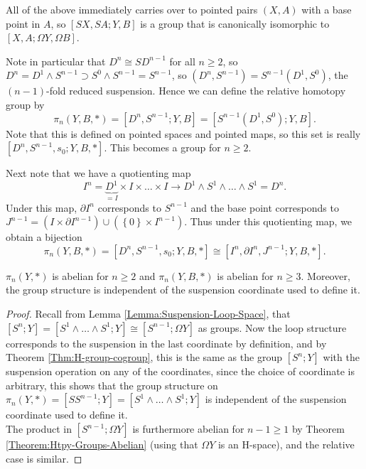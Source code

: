   All of the above immediately carries over to pointed
  pairs $(X,A)$ with a base point in $A$, so
  $\left[ SX, SA ; Y,B \right] $ is a group that
  is canonically isomorphic to
  $\left[ X,A; \Omega Y, \Omega B \right] $.

  Note in particular that
  $D^{n} \cong S D^{n-1}$ for all $n\ge 2$, so
  $D^{n} = D^{1} \wedge S^{n-1} \supset 
  S^{0} \wedge S^{n-1} = S^{n-1}$, so
  $\left( D^{n}, S^{n-1} \right) 
  = S^{n-1} \left( D^{1}, S^{0} \right) $, the
  $(n-1)$-fold reduced suspension. Hence
  we can define the relative homotopy group by
  \[
  \pi_n \left( Y,B,* \right) =
  \left[ D^{n}, S^{n-1}; Y ,B \right] 
  = \left[ S^{n-1}\left( D^{1}, S^{0} \right) ;
  Y,B\right] .
  \] 
  Note that this is defined on pointed spaces and pointed maps,
  so this set is really
  $\left[ D^{n},S^{n-1},s_0; Y,B, * \right] $.
  This becomes a group for $n\ge 2$. 

  Next note that we have a quotienting map
  \[
      I^{n} = \underbrace{D^{1}}_{=I} \times I \times \ldots \times I
      \to D^{1} \wedge S^{1} \wedge \ldots
      \wedge S^{1} =
      D^{n}.
  \] 
  Under this map, 
  $\partial I^{n}$ corresponds to
  $S^{n-1}$ and
  the base point corresponds to
  $J^{n-1} = \left( I \times \partial I^{n-1} \right) 
  \cup  \left( \left\{ 0 \right\} \times I^{n-1} \right) $.
  Thus under this quotienting map, we obtain a
  bijection
  \[
  \pi_n(Y,B,*) =
  \left[ D^{n}, S^{n-1},s_0; Y,B, * \right] 
  \cong \left[ I^{n}, \partial I^{n}, J^{n-1};
  Y,B,*\right].
  \] 

  \begin{corollary}
      $\pi_n(Y,*)$ is abelian for
      $n\ge 2$ and $\pi_n (Y,B,*)$ is abelian for
      $n\ge 3$. Moreover, the group structure is
      independent of the suspension coordinate used
      to define it.
  \end{corollary}

  \begin{proof}
      Recall from Lemma \ref{Lemma:Suspension-Loop-Space}, that
      $\left[ S^{n};Y \right] 
      = \left[ S^{1} \wedge \ldots \wedge S^{1};Y \right] 
      \cong \left[ S^{n-1} ; \Omega Y \right] $ as
      groups. Now
      the loop structure corresponds to the suspension in
      the last coordinate by definition, and
      by Theorem \ref{Thm:H-group-cogroup}, this
      is the same as the group 
      $\left[ S^{n};Y \right] $ with the suspension
      operation on any of the coordinates, since
      the choice of coordinate is arbitrary, this
      shows that
      the group structure on $\pi_n(Y,*) =
      \left[ S S^{n-1};Y \right]
      = \left[ S^{1} \wedge \ldots \wedge
      S^{1}; Y \right] $ is independent
      of the suspension coordinate used to define it.\\
      The product in $\left[ S^{n-1}; \Omega Y \right] $ is
      furthermore abelian for $n-1 \ge 1$ by
      Theorem \ref{Theorem:Htpy-Groups-Abelian} (using that
      $\Omega Y$ is an H-space), and
      the relative case is similar.
  \end{proof}

